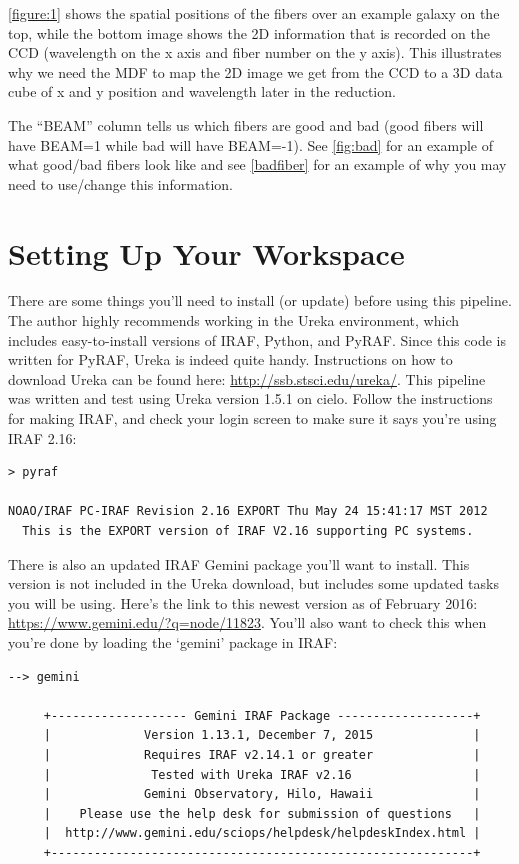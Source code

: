 \documentclass[12pt]{report}
\begin{document}
\autoref{figure:1} shows the spatial positions of the fibers over an example galaxy on the top, while the bottom image shows the 2D information that is recorded on the CCD (wavelength on the x axis and fiber number on the y axis). This illustrates why we need the MDF to map the 2D image we get from the CCD to a 3D data cube of x and y position and wavelength later in the reduction.

The ``BEAM'' column tells us which fibers are good and bad (good fibers will have BEAM=1 while bad will have BEAM=-1). See \autoref{fig:bad} for an example of what good/bad fibers look like and see \autoref{badfiber} for an example of why you may need to use/change this information. 

\chapter{Setting Up Your Workspace}

There are some things you'll need to install (or update) before using this pipeline. The author highly recommends working in the Ureka environment, which includes easy-to-install versions of IRAF, Python, and PyRAF. Since this code is written for PyRAF, Ureka is indeed quite handy. Instructions on how to download Ureka can be found here: \url{http://ssb.stsci.edu/ureka/}. This pipeline was written and test using Ureka version 1.5.1 on cielo. Follow the instructions for making IRAF, and check your login screen to make sure it says you're using IRAF 2.16:

\begin{verbatim}
> pyraf

NOAO/IRAF PC-IRAF Revision 2.16 EXPORT Thu May 24 15:41:17 MST 2012
  This is the EXPORT version of IRAF V2.16 supporting PC systems.
\end{verbatim}

There is also an updated IRAF Gemini package you'll want to install. This version is not included in the Ureka download, but includes some updated tasks you will be using. Here's the link to this newest version as of February 2016: \url{https://www.gemini.edu/?q=node/11823}. You'll also want to check this when you're done by loading the `gemini' package in IRAF:

\begin{verbatim}
--> gemini

     +------------------- Gemini IRAF Package -------------------+
     |             Version 1.13.1, December 7, 2015              |
     |             Requires IRAF v2.14.1 or greater              |
     |              Tested with Ureka IRAF v2.16                 |
     |             Gemini Observatory, Hilo, Hawaii              |
     |    Please use the help desk for submission of questions   |
     |  http://www.gemini.edu/sciops/helpdesk/helpdeskIndex.html |
     +-----------------------------------------------------------+
\end{verbatim}
\end{document}
